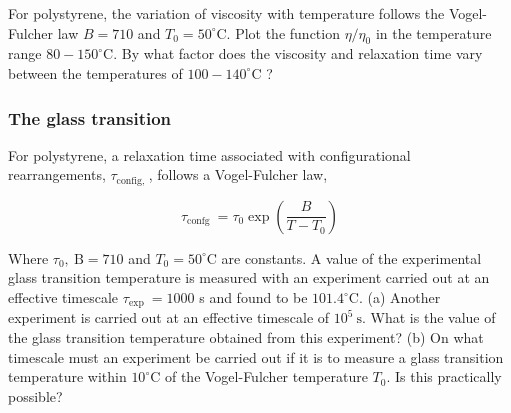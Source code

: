 \documentclass[
  letterpaper,
  DIV=11,
  numbers=noendperiod]{scrartcl}
\begin{document}
For polystyrene, the variation of viscosity with temperature follows the
Vogel-Fulcher law \(B=710\) and \(T_{0}=50^{\circ} \mathrm{C}\). Plot
the function \(\eta / \eta_{0}\) in the temperature range
\(80-150^{\circ} \mathrm{C}\). By what factor does the viscosity and
relaxation time vary between the temperatures of
\(100-140^{\circ} \mathrm{C}\) ?

\subsubsection{The glass transition}\label{the-glass-transition}

For polystyrene, a relaxation time associated with configurational
rearrangements, \(\tau_{\text {config, }}\), follows a Vogel-Fulcher
law,

\[
\tau_{\text {confg }}=\tau_{0} \exp \left(\frac{B}{T-T_{0}}\right)
\]

Where \(\tau_{0}, \mathrm{~B}=710\) and \(T_{0}=50^{\circ} \mathrm{C}\)
are constants. A value of the experimental glass transition temperature
is measured with an experiment carried out at an effective timescale
\(\tau_{\text {exp }}=1000\) s and found to be
\(101.4^{\circ} \mathrm{C}\). (a) Another experiment is carried out at
an effective timescale of \(10^{5} \mathrm{~s}\). What is the value of
the glass transition temperature obtained from this experiment? (b) On
what timescale must an experiment be carried out if it is to measure a
glass transition temperature within \(10^{\circ} \mathrm{C}\) of the
Vogel-Fulcher temperature \(T_{0}\). Is this practically possible?
\end{document}
